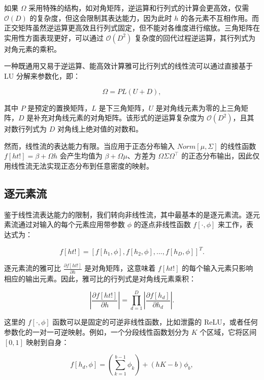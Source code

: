 如果 \(\Omega\) 采用特殊的结构，如对角矩阵，逆运算和行列式的计算会更高效，仅需 \(\mathcal{O}(D)\) 的复杂度，但这会限制其表达能力，因为此时 \(h\) 的各元素不互相作用。而正交矩阵虽然逆运算更高效且行列式固定，但不能对各维度进行缩放。三角矩阵在实用性方面表现更好，可以通过 \(\mathcal{O}(D^2)\) 复杂度的回代过程逆运算，其行列式为对角元素的乘积。

一种既通用又易于逆运算、能高效计算雅可比行列式的线性流可以通过直接基于 LU 分解来参数化，即：

\begin{equation}
\Omega = PL(U + D), 
\end{equation}

其中 \(P\) 是预定的置换矩阵，\(L\) 是下三角矩阵，\(U\) 是对角线元素为零的上三角矩阵，\(D\) 是补充对角线元素的对角矩阵。该形式的逆运算复杂度为 \(\mathcal{O}(D^2)\)，且其对数行列式为 \(D\) 对角线上绝对值的对数和。

然而，线性流的表达能力有限。当应用于正态分布输入 \(Norm[\mu, \Sigma]\) 的线性函数 \(f[ht!] = \beta + \Omega h\) 会产生均值为 \(\beta + \Omega \mu\)、方差为 \(\Omega \Sigma \Omega^\top\) 的正态分布输出，因此仅用线性流无法实现正态分布到任意密度的映射。

\subsection{逐元素流}
鉴于线性流表达能力的限制，我们转向非线性流，其中最基本的是逐元素流。逐元素流通过对输入的每个元素应用带参数 \(\phi\) 的逐点非线性函数 \(f[\cdot, \phi]\) 来工作，表达式为：

\begin{equation}
f[ht!] = [f[h_1, \phi], f[h_2, \phi], ..., f[h_D, \phi]]^T. 
\end{equation}

逐元素流的雅可比 \(\frac{\partial f[ht!]}{\partial h}\) 是对角矩阵，这意味着 \(f[ht!]\) 的每个输入元素只影响相应的输出元素。因此，雅可比的行列式是对角线元素乘积：

\begin{equation}
\left| \frac{\partial f[ht!]}{\partial h} \right| = \prod_{d=1}^D \left| \frac{\partial f[h_d]}{\partial h_d} \right|. 
\end{equation}

这里的 \(f[\cdot, \phi]\) 函数可以是固定的可逆非线性函数，比如泄露的 ReLU，或者任何参数化的一对一可逆映射。例如，一个分段线性函数划分为 \(K\) 个区域，它将区间 \([0, 1]\) 映射到自身：

\begin{equation}
f[h_d, \phi] = \left( \sum_{k=1}^{b-1} \phi_k \right) + (hK - b)\phi_b, 
\end{equation}


